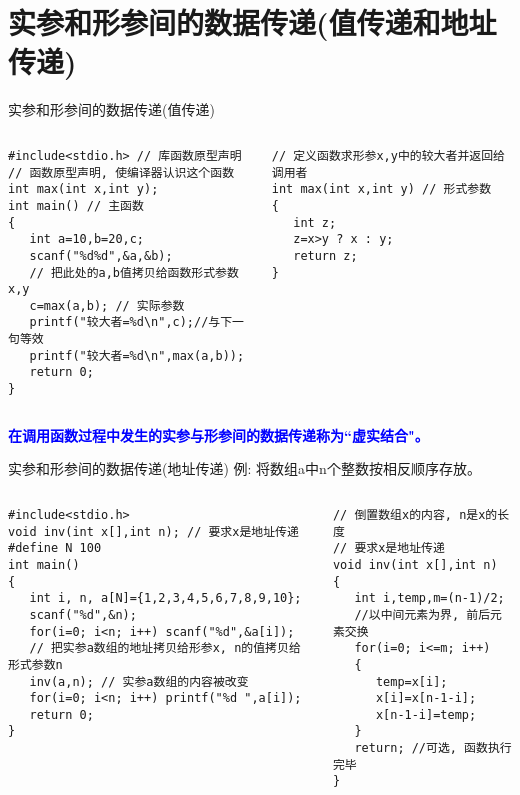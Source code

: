 \section{实参和形参间的数据传递(值传递和地址传递)}

\begin{frame}{实参和形参间的数据传递(值传递)}
\vspace{-0.3cm}
\begin{columns}[T]
\begin{lstlisting}
#include<stdio.h> // 库函数原型声明
// 函数原型声明, 使编译器认识这个函数
int max(int x,int y); 
int main() // 主函数
{
   int a=10,b=20,c;
   scanf("%d%d",&a,&b);
   // 把此处的a,b值拷贝给函数形式参数x,y
   c=max(a,b); // 实际参数 
   printf("较大者=%d\n",c);//与下一句等效
   printf("较大者=%d\n",max(a,b));
   return 0; 
}
\end{lstlisting}
\begin{lstlisting}[frame=leftline]
// 定义函数求形参x,y中的较大者并返回给调用者
int max(int x,int y) // 形式参数
{  
   int z;
   z=x>y ? x : y;
   return z; 
}
\end{lstlisting}
\end{columns}
\textbf{\textcolor{blue}{在调用函数过程中发生的实参与形参间的数据传递称为``虚实结合"。}}
\end{frame}

\begin{frame}{实参和形参间的数据传递(地址传递)}
例: 将数组a中n个整数按相反顺序存放。
\begin{columns}[T]
\begin{lstlisting}
#include<stdio.h> 
void inv(int x[],int n); // 要求x是地址传递
#define N 100 
int main() 
{
   int i, n, a[N]={1,2,3,4,5,6,7,8,9,10};
   scanf("%d",&n);
   for(i=0; i<n; i++) scanf("%d",&a[i]);
   // 把实参a数组的地址拷贝给形参x, n的值拷贝给形式参数n
   inv(a,n); // 实参a数组的内容被改变
   for(i=0; i<n; i++) printf("%d ",a[i]);
   return 0; 
}
\end{lstlisting}
\begin{lstlisting}[frame=leftline]
// 倒置数组x的内容, n是x的长度
// 要求x是地址传递
void inv(int x[],int n) 
{  
   int i,temp,m=(n-1)/2;
   //以中间元素为界, 前后元素交换
   for(i=0; i<=m; i++) 
   {
      temp=x[i]; 
      x[i]=x[n-1-i]; 
      x[n-1-i]=temp;
   }
   return; //可选, 函数执行完毕
}
\end{lstlisting}
\end{columns}
~\\
\end{frame}

